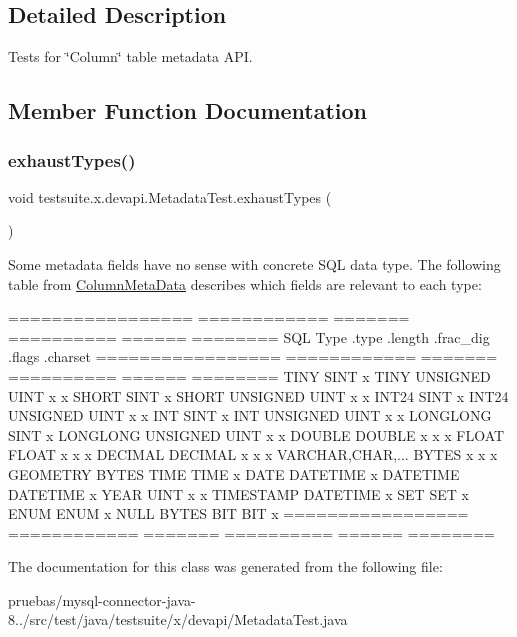 \subsection{Detailed Description}
Tests for \char`\"{}\+Column\char`\"{} table metadata A\+PI. 

\subsection{Member Function Documentation}
\mbox{\label{classtestsuite_1_1x_1_1devapi_1_1_metadata_test_a34826b6e8607c943adb6d708eb52fb8a}} 
\subsubsection{\texorpdfstring{exhaust\+Types()}{exhaustTypes()}}
{\footnotesize\ttfamily void testsuite.\+x.\+devapi.\+Metadata\+Test.\+exhaust\+Types (\begin{DoxyParamCaption}{ }\end{DoxyParamCaption})}

Some metadata fields have no sense with concrete S\+QL data type. The following table from \mbox{\hyperlink{}{Column\+Meta\+Data}} describes which fields are relevant to each type\+:


\begin{DoxyPre}
    ================= ============ ======= ========== ====== ========
    SQL Type          .type        .length .frac\_dig  .flags .charset
    ================= ============ ======= ========== ====== ========
    TINY              SINT         x
    TINY UNSIGNED     UINT         x                  x
    SHORT             SINT         x
    SHORT UNSIGNED    UINT         x                  x
    INT24             SINT         x
    INT24 UNSIGNED    UINT         x                  x
    INT               SINT         x
    INT UNSIGNED      UINT         x                  x
    LONGLONG          SINT         x
    LONGLONG UNSIGNED UINT         x                  x
    DOUBLE            DOUBLE       x       x          x
    FLOAT             FLOAT        x       x          x
    DECIMAL           DECIMAL      x       x          x
    VARCHAR,CHAR,...  BYTES        x                  x      x
    GEOMETRY          BYTES
    TIME              TIME         x
    DATE              DATETIME     x
    DATETIME          DATETIME     x
    YEAR              UINT         x                  x
    TIMESTAMP         DATETIME     x
    SET               SET                                    x
    ENUM              ENUM                                   x
    NULL              BYTES
    BIT               BIT          x
    ================= ============ ======= ========== ====== ========
\end{DoxyPre}
 

The documentation for this class was generated from the following file\+:\begin{DoxyCompactItemize}
\item 
pruebas/mysql-\/connector-\/java-\/8../src/test/java/testsuite/x/devapi/Metadata\+Test.\+java\end{DoxyCompactItemize}
